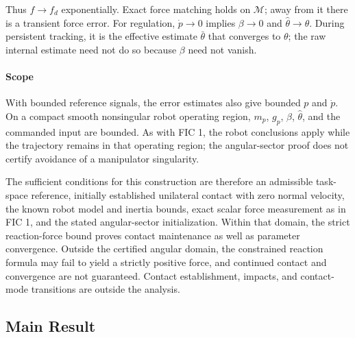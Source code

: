 \documentclass[10pt,journal,letterpaper]{IEEEtran}
\begin{document}
Thus $f\to f_d$ exponentially. Exact force matching holds on $\mathcal M$; away from it there is a transient force error. For regulation, $\dot p\to0$ implies $\beta\to0$ and $\hat\theta\to\theta$. During persistent tracking, it is the effective estimate $\bar\theta$ that converges to $\theta$; the raw internal estimate need not do so because $\beta$ need not vanish.

\paragraph{Scope}

With bounded reference signals, the error estimates also give bounded $p$ and $\dot p$. On a compact smooth nonsingular robot operating region, $m_p$, $g_p$, $\beta$, $\hat\theta$, and the commanded input are bounded. As with FIC 1, the robot conclusions apply while the trajectory remains in that operating region; the angular-sector proof does not certify avoidance of a manipulator singularity.

The sufficient conditions for this construction are therefore an admissible task-space reference, initially established unilateral contact with zero normal velocity, the known robot model and inertia bounds, exact scalar force measurement as in FIC 1, and the stated angular-sector initialization. Within that domain, the strict reaction-force bound proves contact maintenance as well as parameter convergence. Outside the certified angular domain, the constrained reaction formula may fail to yield a strictly positive force, and continued contact and convergence are not guaranteed. Contact establishment, impacts, and contact-mode transitions are outside the analysis.

\subsection{Main Result}
\end{document}
